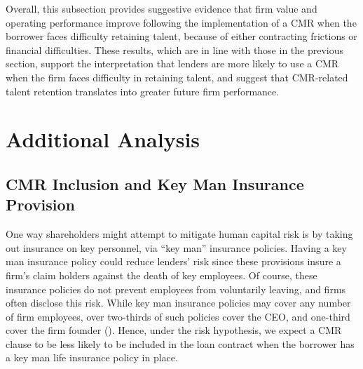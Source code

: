 \documentclass[a4paper,12pt]{article}
\begin{document}
Overall, this subsection provides suggestive evidence that firm value and operating performance improve following the implementation of a CMR when the borrower faces difficulty retaining talent, because of either contracting frictions or financial difficulties.
These results, which are in line with those in the previous section, support the interpretation that lenders are more likely to use a CMR when the firm faces difficulty in retaining talent, and suggest that CMR-related talent retention translates into greater future firm performance.











\section{Additional Analysis}
\label{section:additional}

\subsection{CMR Inclusion and Key Man Insurance Provision}
\label{section:keyman}

One way shareholders might attempt to mitigate human capital risk is by taking out insurance on key personnel, via ``key man'' insurance policies.
Having a key man insurance policy could reduce lenders' risk since these provisions insure a firm's claim holders against the death of key employees.
Of course, these insurance policies do not prevent employees from voluntarily leaving, and firms often disclose this risk.
While key man insurance policies may cover any number of firm employees, over two-thirds of such policies cover the CEO, and one-third cover the firm founder (\citet{Israelsen_2017}).
Hence, under the risk hypothesis, we expect a CMR clause to be less likely to be included in the loan contract when the borrower has a key man life insurance policy in place.
\end{document}
